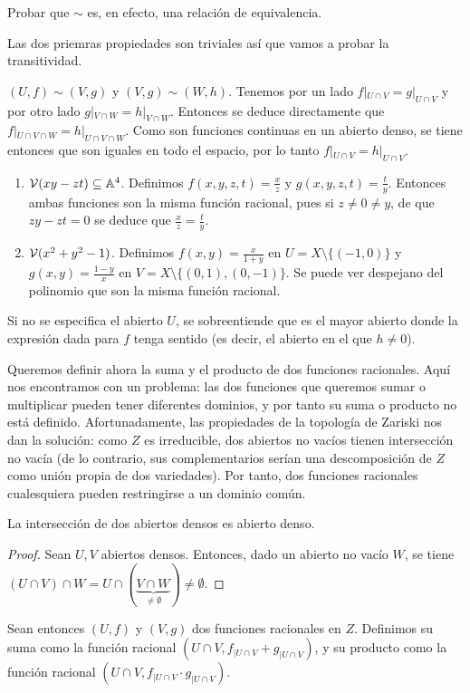 \documentclass[ACGA.tex]{subfiles}
\begin{document}
\begin{ejer}
 Probar que $\sim$ es, en efecto, una relación de equivalencia.
\end{ejer}

\begin{solucion}
Las dos priemras propiedades son triviales así que vamos a probar la transitividad. 

$(U,f)\sim (V,g)$ y $(V,g)\sim (W,h)$. Tenemos por un lado $f|_{U\cap V}=g|_{U\cap V}$ y por otro lado $g|_{V\cap W}=h|_{V\cap W}$. Entonces se deduce directamente que $f|_{U\cap V\cap W}=h|_{U\cap V\cap W}$. Como son funciones continuas en un abierto denso, se tiene entonces que son iguales en todo el espacio, por lo tanto $f|_{U\cap V}=h|_{U\cap V}$.
\end{solucion}

\begin{ej}
\begin{enumerate}
\item $\mathcal{V}(xy-zt)\subseteq\mathbb{A}^4$. Definimos $f(x,y,z,t)=\frac{x}{z}$ y $g(x,y,z,t)=\frac{t}{y}$. Entonces ambas funciones son la misma función racional, pues si $z\neq 0\neq y$, de que $zy-zt=0$ se deduce que $\frac{x}{z}=\frac{t}{y}$. 
\item $\mathcal{V}(x^2+y^2-1)$. Definimos $f(x,y)=\frac{x}{1+y}$ en $U=X\setminus\{(-1,0)\}$ y $g(x,y)=\frac{1-y}{x}$ en $V=X\setminus\{(0,1),(0,-1)\}$. Se puede ver despejano del polinomio que son la misma función racional.
\end{enumerate}
\end{ej}

Si no se especifica el abierto $U$, se sobreentiende que es el mayor abierto donde la expresión dada para $f$ tenga sentido (es decir, el abierto en el que $h\neq 0$).


Queremos definir ahora la suma y el producto de dos funciones racionales. Aquí nos encontramos con un problema: las dos funciones que queremos sumar o multiplicar pueden tener diferentes dominios, y por tanto su suma o producto no está definido. Afortunadamente, las propiedades de la topología de Zariski nos dan la solución: como $Z$ es irreducible, dos abiertos no vacíos tienen intersección no vacía (de lo contrario, sus complementarios serían una descomposición de $Z$ como unión propia de dos variedades). Por tanto, dos funciones racionales cualesquiera pueden restringirse a un dominio común. 

\begin{prop}
La intersección de dos abiertos densos es abierto denso.
\end{prop}
\begin{proof}
Sean $U,V$ abiertos densos. Entonces, dado un abierto no vacío $W$, se tiene $(U\cap V)\cap W=U\cap(\underbrace{V\cap W}_{\neq\emptyset})\neq\emptyset$.
\end{proof}
Sean entonces $(U,f)$ y $(V,g)$ dos funciones racionales en $Z$. Definimos su suma como la función racional $(U\cap V,f_{|U\cap V}+g_{|U\cap V})$, y su producto como la función racional $(U\cap V,f_{|U\cap V}\cdot g_{|U\cap V})$.
\end{document}
